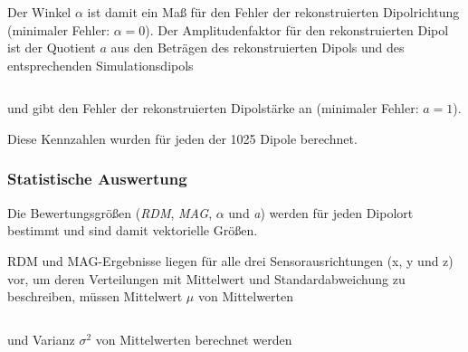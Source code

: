 \begin{center}
\begin{supertabular}{m{14.909cm}m{1.689cm}}

\end{supertabular}
\end{center}
Der Winkel $\alpha $ ist damit ein Maß für den Fehler der
rekonstruierten Dipolrichtung (minimaler Fehler: $\alpha =0$). Der
Amplitudenfaktor für den rekonstruierten Dipol ist der Quotient $a$ aus
den Beträgen des rekonstruierten Dipols und des entsprechenden
Simulationsdipols

\begin{center}
\begin{supertabular}{m{14.909cm}m{1.689cm}}

\end{supertabular}
\end{center}
und gibt den Fehler der rekonstruierten Dipolstärke an (minimaler
Fehler: $a=1$).

Diese Kennzahlen wurden für jeden der 1025 Dipole berechnet.

\subsubsection{Statistische Auswertung}
Die Bewertungsgrößen (\textit{RDM}, \textit{MAG},  $\alpha $  und
\textit{a}) werden für jeden Dipolort bestimmt und sind damit
vektorielle Größen. 

RDM und MAG-Ergebnisse liegen für alle drei Sensorausrichtungen (x, y
und z) vor, um deren Verteilungen mit Mittelwert und Standardabweichung
zu beschreiben, müssen Mittelwert  $\mu $ von Mittelwerten

\begin{center}
\begin{supertabular}{m{14.909cm}m{1.689cm}}

\end{supertabular}
\end{center}
und Varianz  $\sigma ^{2}$  von Mittelwerten berechnet werden

